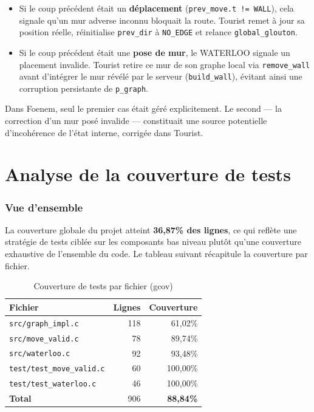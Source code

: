 \documentclass[12pt,a4paper]{article}
\begin{document}
\begin{itemize}
    \item Si le coup précédent était un \textbf{déplacement} 
    (\texttt{prev\_move.t != WALL}), cela signale qu'un mur adverse inconnu 
    bloquait la route. Tourist remet à jour sa position réelle, réinitialise 
    \texttt{prev\_dir} à \texttt{NO\_EDGE} et relance \texttt{global\_glouton}.
    \item Si le coup précédent était une \textbf{pose de mur}, le WATERLOO 
    signale un placement invalide. Tourist retire ce mur de son graphe local 
    via \texttt{remove\_wall} avant d'intégrer le mur révélé par le serveur 
    (\texttt{build\_wall}), évitant ainsi une corruption persistante de 
    \texttt{p\_graph}.
\end{itemize}

\noindent Dans Foenem, seul le premier cas était géré explicitement. Le second 
--- la correction d'un mur posé invalide --- constituait une source potentielle 
d'incohérence de l'état interne, corrigée dans Tourist.




\section{Analyse de la couverture de tests}
\label{sec:resultats}
\subsubsection{Vue d'ensemble}

La couverture globale du projet atteint \textbf{36,87\% des lignes}, ce qui 
reflète une stratégie de tests ciblée sur les composants bas niveau plutôt 
qu'une couverture exhaustive de l'ensemble du code. Le tableau suivant 
récapitule la couverture par fichier.

\begin{table}[h]
\centering
\begin{tabular}{|l|r|r|}
\hline
\textbf{Fichier} & \textbf{Lignes} & \textbf{Couverture} \\
\hline
\texttt{src/graph\_impl.c}   & 118 & 61,02\% \\
\texttt{src/move\_valid.c}   &  78 & 89,74\% \\
\texttt{src/waterloo.c}      &  92 & 93,48\% \\
\hline
\texttt{test/test\_move\_valid.c} & 60 & 100,00\% \\
\texttt{test/test\_waterloo.c}    & 46 & 100,00\% \\
\hline
\textbf{Total}               & 906 & \textbf{88,84\%} \\
\hline
\end{tabular}
\caption{Couverture de tests par fichier (gcov)}
\end{table}
\end{document}
